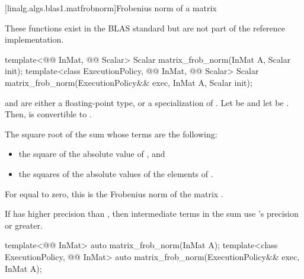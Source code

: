 [linalg.algs.blas1.matfrobnorm]{Frobenius norm of a matrix}

\pnum
\begin{note}
These functions exist in the BLAS standard\supercite{blas-std}
but are not part of the reference implementation.
\end{note}

%
\begin{itemdecl}
template<@@ InMat, @@ Scalar>
  Scalar matrix_frob_norm(InMat A, Scalar init);
template<class ExecutionPolicy, @@ InMat, @@ Scalar>
  Scalar matrix_frob_norm(ExecutionPolicy&& exec, InMat A, Scalar init);
\end{itemdecl}

\begin{itemdescr}

\pnum
\mandates
{} and  are either a floating-point type, or
a specialization of .
Let  be
 and
let  be .
Then, 
is convertible to .

\pnum
\returns
The square root of the sum
whose terms are the following:
\begin{itemize}
\item
the square of the absolute value of , and
\item
the squares of the absolute values of the elements of .
\end{itemize}
\begin{note}
For  equal to zero,
this is the Frobenius norm of the matrix .
\end{note}

\pnum
\remarks
If  has higher precision
than ,
then intermediate terms in the sum use 's precision or greater.
\end{itemdescr}

%
\begin{itemdecl}
template<@@ InMat>
  auto matrix_frob_norm(InMat A);
template<class ExecutionPolicy, @@ InMat>
  auto matrix_frob_norm(ExecutionPolicy&& exec, InMat A);
\end{itemdecl}


